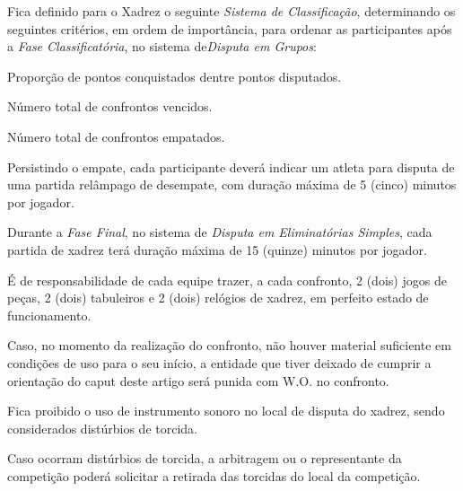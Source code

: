 \begin{article}
	Fica definido para o Xadrez o seguinte \textit{Sistema de Classificação}, determinando os seguintes critérios, em ordem de importância, para ordenar as participantes após a \textit{Fase Classificatória}, no sistema de\textit {Disputa em Grupos}:

	\begin{xparagraph}
		Proporção de pontos conquistados dentre pontos disputados.
	\end{xparagraph}

	\begin{xparagraph}
		Número total de confrontos vencidos.
	\end{xparagraph}

	\begin{xparagraph}
		Número total de confrontos empatados.
	\end{xparagraph}

	\begin{xparagraph}
		Persistindo o empate, cada participante deverá indicar um atleta para disputa de uma partida relâmpago de desempate, com duração máxima de 5 (cinco) minutos por jogador.
	\end{xparagraph}
\end{article}

\begin{article}
	Durante a \textit{Fase Final}, no sistema de \textit{Disputa em Eliminatórias Simples}, cada partida de xadrez terá duração máxima de 15 (quinze) minutos por jogador.
\end{article}

\begin{article}
	É de responsabilidade de cada equipe trazer, a cada confronto, 2 (dois) jogos de peças, 2 (dois) tabuleiros e 2 (dois) relógios de xadrez, em perfeito estado de funcionamento.

	\begin{xparagraph}
		Caso, no momento da realização do confronto, não houver material suficiente em condições de uso para o seu início, a entidade que tiver deixado de cumprir a orientação do caput deste artigo será punida com W.O. no confronto.
	\end{xparagraph}
\end{article}

\begin{article}
	Fica proibido o uso de instrumento sonoro no local de disputa do xadrez, sendo considerados distúrbios de torcida.

	\begin{xparagraph}
		Caso ocorram distúrbios de torcida, a arbitragem ou o representante da competição poderá solicitar a retirada das torcidas do local da competição.
	\end{xparagraph}
\end{article}

